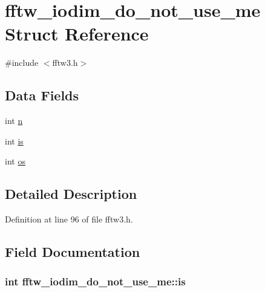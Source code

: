\hypertarget{structfftw__iodim__do__not__use__me}{\section{fftw\-\_\-iodim\-\_\-do\-\_\-not\-\_\-use\-\_\-me \-Struct \-Reference}
\label{dd/df3/structfftw__iodim__do__not__use__me}
}


{\ttfamily \#include $<$fftw3.\-h$>$}

\subsection*{\-Data \-Fields}
\begin{DoxyCompactItemize}
\item 
int \hyperlink{structfftw__iodim__do__not__use__me_aa9ceb61afc1731380bdb48305aa40ce0}{n}
\item 
int \hyperlink{structfftw__iodim__do__not__use__me_a7571fd050be3b9c9486d41086b657099}{is}
\item 
int \hyperlink{structfftw__iodim__do__not__use__me_acff6a6b2225f610d3bee5380e801abb4}{os}
\end{DoxyCompactItemize}


\subsection{\-Detailed \-Description}


\-Definition at line 96 of file fftw3.\-h.



\subsection{\-Field \-Documentation}
\hypertarget{structfftw__iodim__do__not__use__me_a7571fd050be3b9c9486d41086b657099}{
\subsubsection[{is}]{\setlength{\rightskip}{0pt plus 5cm}int {\bf fftw\-\_\-iodim\-\_\-do\-\_\-not\-\_\-use\-\_\-me\-::is}}}\label{dd/df3/structfftw__iodim__do__not__use__me_a7571fd050be3b9c9486d41086b657099}


